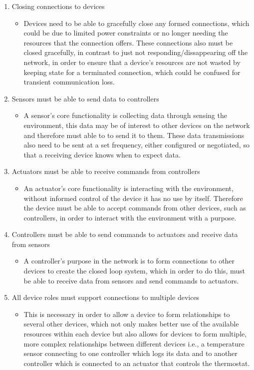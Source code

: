 \begin{enumerate}
\begin{itemize}
	\end{itemize}
	\item Closing connections to devices
	\begin{itemize}
		\item Devices need to be able to gracefully close any formed connections, which could be due to limited power constraints or no longer needing the resources that the connection offers. These connections also must be closed gracefully, in contrast to just not responding/dissappearing off the network, in order to ensure that a device's resources are not wasted by keeping state for a terminated connection, which could be confused for transient communication loss.
	\end{itemize}
	\item Sensors must be able to send data to controllers
	\begin{itemize}
		\item A sensor's core functionality is collecting data through sensing the environment, this data may be of interest to other devices on the network and therefore must able to to send it to them. These data transmissions also need to be sent at a set frequency, either configured or negotiated, so that a receiving device knows when to expect data.
	\end{itemize}
	\item Actuators must be able to receive commands from controllers
	\begin{itemize}
		\item An actuator's core functionality is interacting with the environment, without informed control of the device it has no use by itself. Therefore the device must be able to accept commands from other devices, such as controllers, in order to interact with the environment with a purpose.
	\end{itemize}
	\item Controllers must be able to send commands to actuators and receive data from sensors
	\begin{itemize}
		\item A controller's purpose in the network is to form connections to other devices to create the closed loop system, which in order to do this, must be able to receive data from sensors and send commands to actuators. 
	\end{itemize}
	\item All device roles must support connections to multiple devices 
	\begin{itemize}
		\item This is necessary in order to allow a device to form relationships to several other devices, which not only makes better use of the available resources within each device but also allows for devices to form multiple, more complex relationships between different devices i.e., a temperature sensor connecting to one controller which logs its data and to another controller which is connected to an actuator that controls the thermostat.

\end{itemize}
\end{enumerate}
